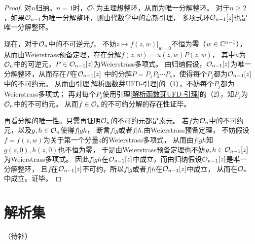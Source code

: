 \begin{proof}
对$n$归纳。$n=1$时，$\mathcal{O}_1$为主理想整环，从而为唯一分解整环。
对于$n\geq 2$，如果$\mathcal{O}_{n-1}$为唯一分解整环，则由代数学中的高斯引理，
多项式环$\mathcal{O}_{n-1}[z]$也是唯一分解整环。

现在，对于$\mathcal{O}_n$中的不可逆元$f$，
不妨$z\mapsto f(z,w)|_{w=0}$不恒为零（$w\in\mathbb{C}^{n-1}$），
从而由Weierstrass预备定理，存在分解$f(z,w)=u(z,w)P(z,w)$，
其中$u$为$\mathcal{O}_n$中的可逆元，$P\in\mathcal{O}_{n-1}[z]$为Weierstrass多项式。
由归纳假设，$\mathcal{O}_{n-1}[z]$为唯一分解整环，从而存在$P$在$\mathcal{O}_{n-1}[z]$
中的分解$P=P_1P_2\cdots P_s$，使得每个$P_j$都为$\mathcal{O}_{n-1}[z]$中的不可约元。
从而由引理\ref{解析函数芽UFD-引理}的（1），不妨每个$P_j$都为Weierstrass多项式；
再对每个$P_j$使用引理\ref{解析函数芽UFD-引理}的（2），知$P_j$为$\mathcal{O}_n$中的不可约元。
从而$f\in\mathcal{O}_n$的不可约分解的存在性证毕。

再看分解的唯一性。只需再证明$\mathcal{O}_n$的不可约元都是素元。
若$f$为$\mathcal{O}_n$中的不可约元，以及$g,h\in\mathcal{O}_n$使得$f|gh$，
断言$f|g$或者$f|h$.由Weierstrass预备定理，
不妨假设$f=f(z,w)$为关于第一个分量$z$的Weierstrass多项式，
从而由$f|gh$知$g(z,0),h(z,0)$也不恒为零，
于是由Weierstrass预备定理也不妨$g,h\in\mathcal{O}_{n-1}[z]$为Weierstrass多项式。
因此$f|gh$在$\mathcal{O}_{n-1}[z]$中成立，而由归纳假设$\mathcal{O}_{n-1}[z]$是唯一分解整环，
且$f$在$\mathcal{O}_{n-1}[z]$不可约，所以$f|g$或者$f|h$在$\mathcal{O}_{n-1}[z]$中成立，
从而在$\mathcal{O}_n$中成立。证毕。
\end{proof}

\section{解析集}
（待补）





